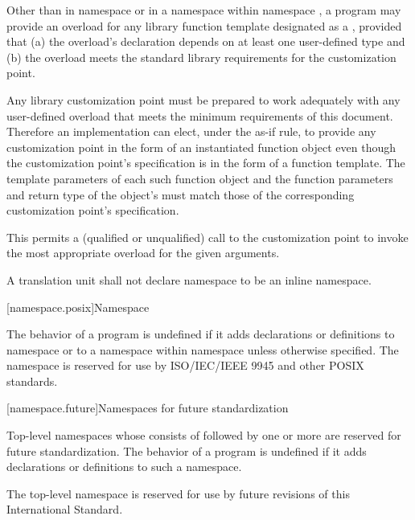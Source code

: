 \pnum
Other than in namespace 
or in a namespace
within namespace ,
a program may provide
an overload for any library function template
designated as a ,
provided that
(a)
the overload's declaration depends
on at least one user-defined type
and
(b)
the overload meets the standard library requirements
for the customization point.
\begin{footnote}
Any library customization point
must be prepared
to work adequately
with any user-defined overload
that meets the minimum requirements
of this document.
Therefore
an implementation can elect,
under the as-if rule,
to provide any customization point
in the form
of an instantiated function object
even though the customization point's specification
is in the form
of a function template.
The template parameters
of each such function object
and the function parameters
and return type
of the object's 
must match those
of the corresponding customization point's specification.
\end{footnote}
\begin{note}
This permits
a (qualified or unqualified) call
to the customization point
to invoke the most appropriate overload
for the given arguments.
\end{note}

\pnum
A translation unit shall not declare namespace  to be an inline namespace.

[namespace.posix]{Namespace }

\pnum
The behavior of a \Cpp{} program is undefined if it adds declarations or definitions to namespace
or to a namespace within namespace
unless otherwise specified. The namespace  is reserved for use by
ISO/IEC/IEEE 9945 and other POSIX standards.

[namespace.future]{Namespaces for future standardization}

\pnum
Top-level namespaces whose  consists of 
followed by one or more 
are reserved for future standardization.
The behavior of a \Cpp{} program is undefined if
it adds declarations or definitions to such a namespace.
\begin{example}
The top-level namespace  is reserved
for use by future revisions of this International Standard.
\end{example}

